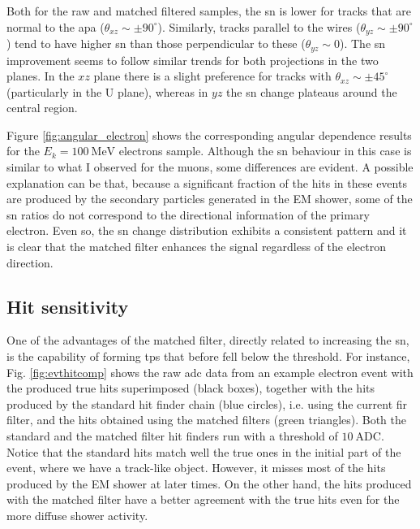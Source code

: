 Both for the raw and matched filtered samples, the \gls{sn} is lower for tracks that are normal to the \gls{apa} ($\theta_{xz} \sim \pm 90^{\circ}$). Similarly, tracks parallel to the wires ($\theta_{yz} \sim \pm 90^{\circ}$) tend to have higher \gls{sn} than those perpendicular to these ($\theta_{yz} \sim 0$). The \gls{sn} improvement seems to follow similar trends for both projections in the two planes. In the $xz$ plane there is a slight preference for tracks with $\theta_{xz} \sim \pm 45^{\circ}$ (particularly in the U plane), whereas in $yz$ the \gls{sn} change plateaus around the central region.

Figure \ref{fig:angular_electron} shows the corresponding angular dependence results for the $E_{k}=100 \ \mathrm{MeV}$ electrons sample. Although the \gls{sn} behaviour in this case is similar to what I observed for the muons, some differences are evident. A possible explanation can be that, because a significant fraction of the hits in these events are produced by the secondary particles generated in the EM shower, some of the \gls{sn} ratios do not correspond to the directional information of the primary electron. Even so, the \gls{sn} change distribution exhibits a consistent pattern and it is clear that the matched filter enhances the signal regardless of the electron direction.

\subsection{Hit sensitivity}
\label{subsec:2.5.3}

One of the advantages of the matched filter, directly related to increasing the \gls{sn}, is the capability of forming \gls{tp}s that before fell below the threshold. For instance, Fig. \ref{fig:evthitcomp} shows the raw \gls{adc} data from an example electron event with the produced true hits superimposed (black boxes), together with the hits produced by the standard hit finder chain (blue circles), i.e. using the current \gls{fir} filter, and the hits obtained using the matched filters (green triangles). Both the standard and the matched filter hit finders run with a threshold of $10 \ \mathrm{ADC}$. Notice that the standard hits match well the true ones in the initial part of the event, where we have a track-like object. However, it misses most of the hits produced by the EM shower at later times. On the other hand, the hits produced with the matched filter have a better agreement with the true hits even for the more diffuse shower activity.

